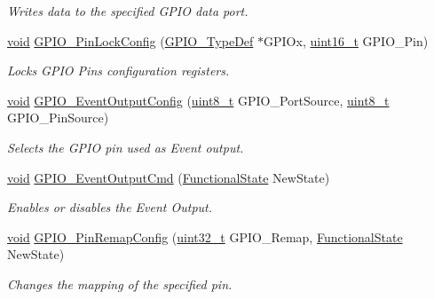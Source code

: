 \begin{DoxyCompactItemize}
\begin{DoxyCompactList}\small\item\em Writes data to the specified G\+P\+IO data port. \end{DoxyCompactList}\item 
\hyperlink{usb__devapi_8h_afabf60e7f57651d6d595a02c75f07cd0}{void} \hyperlink{group___g_p_i_o___private___functions_gad2f2e615928c69fd0d8c641a7cedaafc}{G\+P\+I\+O\+\_\+\+Pin\+Lock\+Config} (\hyperlink{struct_g_p_i_o___type_def}{G\+P\+I\+O\+\_\+\+Type\+Def} $\ast$G\+P\+I\+Ox, \hyperlink{_p_e___types_8h_a1f1825b69244eb3ad2c7165ddc99c956}{uint16\+\_\+t} G\+P\+I\+O\+\_\+\+Pin)
\begin{DoxyCompactList}\small\item\em Locks G\+P\+IO Pins configuration registers. \end{DoxyCompactList}\item 
\hyperlink{usb__devapi_8h_afabf60e7f57651d6d595a02c75f07cd0}{void} \hyperlink{group___g_p_i_o___private___functions_ga935f31ed7a86c6cb594cf34313b4b7af}{G\+P\+I\+O\+\_\+\+Event\+Output\+Config} (\hyperlink{_p_e___types_8h_aba7bc1797add20fe3efdf37ced1182c5}{uint8\+\_\+t} G\+P\+I\+O\+\_\+\+Port\+Source, \hyperlink{_p_e___types_8h_aba7bc1797add20fe3efdf37ced1182c5}{uint8\+\_\+t} G\+P\+I\+O\+\_\+\+Pin\+Source)
\begin{DoxyCompactList}\small\item\em Selects the G\+P\+IO pin used as Event output. \end{DoxyCompactList}\item 
\hyperlink{usb__devapi_8h_afabf60e7f57651d6d595a02c75f07cd0}{void} \hyperlink{group___g_p_i_o___private___functions_gaf13ab3d59e467df44b492f1cdfe2f588}{G\+P\+I\+O\+\_\+\+Event\+Output\+Cmd} (\hyperlink{agilefox_2library_2inc_2stm32f10x__type_8h_ac9a7e9a35d2513ec15c3b537aaa4fba1}{Functional\+State} New\+State)
\begin{DoxyCompactList}\small\item\em Enables or disables the Event Output. \end{DoxyCompactList}\item 
\hyperlink{usb__devapi_8h_afabf60e7f57651d6d595a02c75f07cd0}{void} \hyperlink{group___g_p_i_o___private___functions_ga64eb76f6211b840daf9829289df4208b}{G\+P\+I\+O\+\_\+\+Pin\+Remap\+Config} (\hyperlink{_p_e___types_8h_a33594304e786b158f3fb30289278f5af}{uint32\+\_\+t} G\+P\+I\+O\+\_\+\+Remap, \hyperlink{agilefox_2library_2inc_2stm32f10x__type_8h_ac9a7e9a35d2513ec15c3b537aaa4fba1}{Functional\+State} New\+State)
\begin{DoxyCompactList}\small\item\em Changes the mapping of the specified pin. \end{DoxyCompactList}\item 

\end{DoxyCompactItemize}

